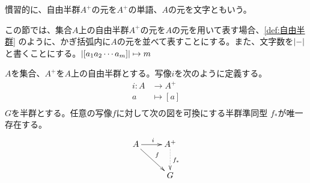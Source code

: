 	慣習的に、自由半群$A^+$の元を$A^+$の単語、$A$の元を文字ともいう。

	この節では、集合$A$上の自由半群$A^+$の元を$A$の元を用いて表す場合、\ref{def:自由半群}
	のように、かぎ括弧内に$A$の元を並べて表すことにする。また、文字数を$\left|{-}\right|$
	と書くことにする。$\left|{\left[{a_1a_2\cdots a_m}\right]}\right|\mapsto m$

	\begin{proposition}[自由半群の普遍性]\label{pro:自由半群の普遍性} %
		$A$を集合、$A^+$を$A$上の自由半群とする。写像$i$を次のように定義する。
		\begin{equation}\begin{split} %
			i: A &\to A^+ \\
				a &\mapsto [a] \\
		\end{split}\end{equation} %
		$G$を半群とする。任意の写像$f$に対して次の図を可換にする半群準同型
		$f_*$が唯一存在する。
		\begin{equation}\xymatrix{
			A \ar[r]^i \ar[rd]^{f} & A^+ \ar@{.>}[d]^{f_*} \\
			& G \\
		}\end{equation}
	\end{proposition} %
